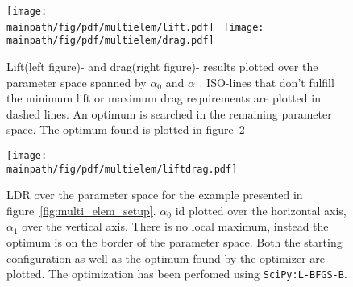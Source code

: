 \documentclass[../main.tex]{subfiles}
\begin{document}
\begin{figure}[t!]
    \centering
    	\texttt{[image: \\mainpath/fig/pdf/multielem/lift.pdf]}~
    	\texttt{[image: \\mainpath/fig/pdf/multielem/drag.pdf]}
    	\caption[Multi-element example: lift and drag]{Lift(left figure)- and drag(right figure)- results plotted over the parameter space spanned by $\alpha_0$ and $\alpha_1$. ISO-lines that don't fulfill the minimum lift or maximum drag requirements are plotted in dashed lines. An optimum is searched in the remaining parameter space. The optimum found is plotted in figure~\ref{fig:multi_elem_ldr}}
    	\label{fig:multi_elem_liftanddrag}
\end{figure}

\begin{figure}[t!]
    \centering
    	\texttt{[image: \\mainpath/fig/pdf/multielem/liftdrag.pdf]}
    	\caption[Multi-element example: LDR-ratio]{\acf{LDR} over the parameter space for the example presented in figure~\ref{fig:multi_elem_setup}. $\alpha_0$ id plotted over the horizontal axis, $\alpha_1$ over the vertical axis. There is no local maximum, instead the optimum is on the border of the parameter space. Both the starting configuration as well as the optimum found by the optimizer are plotted. The optimization has been perfomed using \texttt{SciPy:L-BFGS-B}. }
    	\label{fig:multi_elem_ldr}
\end{figure}
\end{document}
